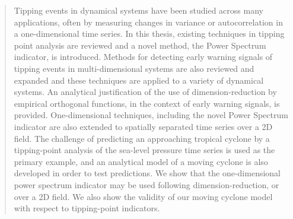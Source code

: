 \begin{abstract}
Tipping events in dynamical systems have been studied across many applications, often by measuring changes in variance or autocorrelation in a one-dimensional time series. In this thesis, existing techniques in tipping point analysis are reviewed and a novel method, the Power Spectrum indicator, is introduced. {} Methods for detecting early warning signals of tipping events in multi-dimensional systems are also reviewed and expanded and these techniques are applied to a variety of dynamical systems. An analytical justification of the use of dimension-reduction by empirical orthogonal functions, in the context of early warning signals, is provided. One-dimensional techniques, including the novel Power Spectrum indicator are also extended to spatially separated time series over a 2D field. The challenge of predicting an approaching tropical cyclone by a tipping-point analysis of the sea-level pressure time series is used as the primary example, and an analytical model of a moving cyclone is also developed in order to test predictions. We show that the one-dimensional power spectrum indicator may be used following dimension-reduction, or over a 2D field. We also show the validity of our moving cyclone model with respect to tipping-point indicators.
\end{abstract}
